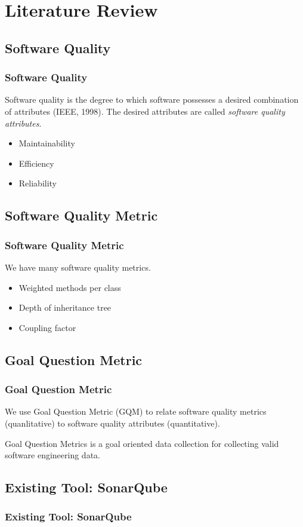 \section{Literature Review}

\subsection{Software Quality}
\begin{frame}
\frametitle{Software Quality}

\begin{definition}
Software quality is the degree to which software possesses a desired combination of attributes (IEEE, 1998). The desired attributes are called \emph{software quality attributes}.
\end{definition} \pause

\begin{example}
\begin{itemize}
  \item Maintainability
  \item Efficiency
  \item Reliability
\end{itemize}
\end{example}

\end{frame}

\subsection{Software Quality Metric}
\begin{frame}
\frametitle{Software Quality Metric}

We have many software quality metrics.

\begin{example}
\begin{itemize}
  \item Weighted methods per class
  \item Depth of inheritance tree
  \item Coupling factor
\end{itemize}
\end{example}

\end{frame}

\subsection{Goal Question Metric}
\begin{frame}
\frametitle{Goal Question Metric}

We use Goal Question Metric (GQM) to relate software quality metrics (quanlitative) to software quality attributes (quantitative).

\begin{definition}
Goal Question Metrics is a goal oriented data collection for collecting valid software engineering data.
\end{definition}


\end{frame}

\subsection{Existing Tool: SonarQube}
\begin{frame}
\frametitle{Existing Tool: SonarQube}

\end{frame}